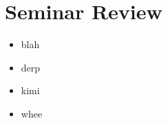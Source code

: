 \section{Seminar Review}

\begin{itemize}
  \item blah \cite{DeDreu2003280}
  \item derp \cite{Ahituv:1998:ETP:1189478.1189487}
  \item kimi \cite{doi:10.1080/00140138408963489}
  \item whee \cite{sheldon2006timeliness}
\end{itemize}
